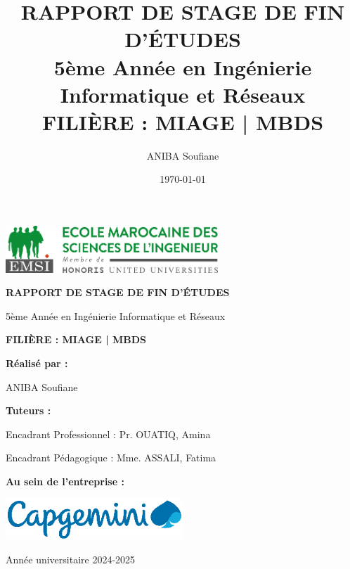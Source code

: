 \documentclass[12pt,a4paper,twoside]{report}
\title{\textbf{RAPPORT DE STAGE DE FIN D'ÉTUDES} \\
       \large{5ème Année en Ingénierie Informatique et Réseaux} \\
       \vspace{0.5cm}
       \textbf{FILIÈRE : MIAGE | MBDS}}
\author{ANIBA Soufiane}
\date{\today}
\begin{document}
\begin{titlepage}
    \centering
    
    \includegraphics[width=0.6\textwidth]{latex_media/media/image1.png}
    
    \vspace{1cm}
    
    {\huge\bfseries RAPPORT DE STAGE DE FIN D'ÉTUDES \par}
    
    \vspace{0.5cm}
    {\Large 5ème Année en Ingénierie Informatique et Réseaux \par}
    
    \vspace{0.5cm}
    {\Large\bfseries FILIÈRE : MIAGE | MBDS \par}
    
    \vspace{2cm}
    
    {\Large\textbf{Réalisé par :} \par}
    \vspace{0.3cm}
    {\Large ANIBA Soufiane \par}
    
    \vspace{2cm}
    
    {\Large\textbf{Tuteurs :} \par}
    \vspace{0.3cm}
    {\large Encadrant Professionnel : Pr. OUATIQ, Amina \par}
    \vspace{0.2cm}
    {\large Encadrant Pédagogique : Mme. ASSALI, Fatima \par}
    
    \vspace{2cm}
    
    {\Large\textbf{Au sein de l'entreprise :} \par}
    \vspace{0.5cm}
    \includegraphics[width=0.5\textwidth]{latex_media/media/image2.png}
    
    \vfill
    
    {\large Année universitaire 2024-2025 \par}
\end{titlepage}
\end{document}
